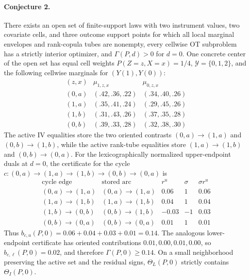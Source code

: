\documentclass[11pt]{article}
\theoremstyle{definition}
\theoremstyle{plain}
\theoremstyle{remark}
\begin{document}
\paragraph{Conjecture 2.}
There exists an open set of finite-support laws with two instrument values, two covariate cells, and three outcome support points for which all local marginal envelopes and rank-copula tubes are nonempty, every cellwise OT subproblem has a strictly interior optimizer, and \(\Gamma(P,d)>0\) for \(d=0\).  One concrete center of the open set has equal cell weights \(P(Z=z,X=x)=1/4\), \(\mathcal Y=\{0,1,2\}\), and the following cellwise marginals for \((Y(1),Y(0))\):
\[
\begin{array}{c|cc}
(z,x) & \mu_{1,z,x} & \mu_{0,z,x}\\ \hline
(0,a) & (.42,.36,.22) & (.34,.40,.26)\\
(1,a) & (.35,.41,.24) & (.29,.45,.26)\\
(1,b) & (.31,.43,.26) & (.37,.35,.28)\\
(0,b) & (.39,.33,.28) & (.32,.38,.30)
\end{array}
\]
The active IV equalities store the two oriented contrasts \((0,a)\to(1,a)\) and \((0,b)\to(1,b)\), while the active rank-tube equalities store \((1,a)\to(1,b)\) and \((0,b)\to(0,a)\).  For the lexicographically normalized upper-endpoint duals at \(d=0\), the certificate for the cycle \(c:(0,a)\to(1,a)\to(1,b)\to(0,b)\to(0,a)\) is
\[
\begin{array}{c|c|c|c|c}
\text{cycle edge} & \text{stored arc} & r^u & \sigma & \sigma r^u\\ \hline
(0,a)\to(1,a) & (0,a)\to(1,a) & 0.06 & 1 & 0.06\\
(1,a)\to(1,b) & (1,a)\to(1,b) & 0.04 & 1 & 0.04\\
(1,b)\to(0,b) & (0,b)\to(1,b) & -0.03 & -1 & 0.03\\
(0,b)\to(0,a) & (0,b)\to(0,a) & 0.01 & 1 & 0.01
\end{array}
\]
Thus \(b_{c,u}(P,0)=0.06+0.04+0.03+0.01=0.14\).  The analogous lower-endpoint certificate has oriented contributions \(0.01,0.00,0.01,0.00\), so \(b_{c,\ell}(P,0)=0.02\), and therefore \(\Gamma(P,0)\ge0.14\).  On a small neighborhood preserving the active set and the residual signs, \(\Theta_L(P,0)\) strictly contains \(\Theta_I(P,0)\).
\end{document}
